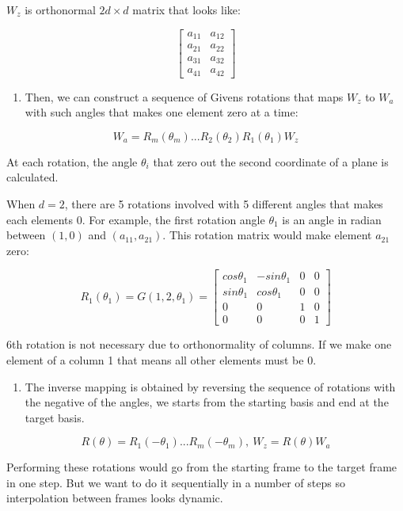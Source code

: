 \(W_z\) is orthonormal \(2d\times d\) matrix that looks like:

\[ \begin{bmatrix} a_{11} & a_{12} \\a_{21}  &a_{22} \\ a_{31}&a_{32} \\a_{41}&a_{42}\end{bmatrix} \]

\begin{enumerate}
\def\labelenumi{\arabic{enumi}.}
\setcounter{enumi}{2}
\tightlist
\item
  Then, we can construct a sequence of Givens rotations that maps \(W_z\) to \(W_a\) with such angles that makes one element zero at a time:
\end{enumerate}

\[ W_a = R_m(\theta_m) ... R_2(\theta_2)R_1(\theta_1)W_z\]

At each rotation, the angle \(\theta_i\) that zero out the second coordinate of a plane is calculated.

When \(d = 2\), there are 5 rotations involved with 5 different angles that makes each elements 0. For example, the first rotation angle \(\theta_1\) is an angle in radian between \((1, 0)\) and \((a_{11}, a_{21})\). This rotation matrix would make element \(a_{21}\) zero:

\[R_1(\theta_1) = G(1, 2, \theta_1) = \begin{bmatrix} cos\theta_1 & -sin\theta_1 & 0 & 0 \\sin\theta_1  &cos\theta_1 & 0 &0 \\ 0&0&1&0 \\0&0&0&1\end{bmatrix}\]

6th rotation is not necessary due to orthonormality of columns. If we make one element of a column 1 that means all other elements must be 0.

\begin{enumerate}
\def\labelenumi{\arabic{enumi}.}
\setcounter{enumi}{3}
\tightlist
\item
  The inverse mapping is obtained by reversing the sequence of rotations with the negative of the angles, we starts from the starting basis and end at the target basis.
\end{enumerate}

\[R(\theta) = R_1(-\theta_1) ... R_m(-\theta_m), \    W_z = R(\theta)W_a\]

Performing these rotations would go from the starting frame to the target frame in one step. But we want to do it sequentially in a number of steps so interpolation between frames looks dynamic.

